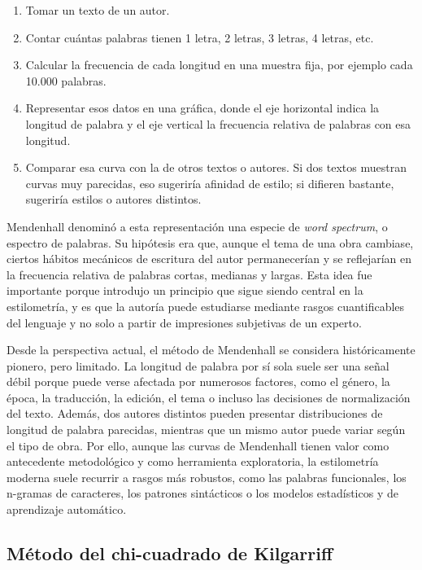 \documentclass[IB]{TFUOC}%
\begin{document}
\begin{enumerate}
    \item Tomar un texto de un autor.
    \item Contar cuántas palabras tienen 1 letra, 2 letras, 3 letras, 4 letras, etc.
    \item Calcular la frecuencia de cada longitud en una muestra fija, por ejemplo cada 10.000 palabras.
    \item Representar esos datos en una gráfica, donde el eje horizontal indica la longitud de palabra y el eje vertical la frecuencia relativa de palabras con esa longitud.
    \item Comparar esa curva con la de otros textos o autores. Si dos textos muestran curvas muy parecidas, eso sugeriría afinidad de estilo; si difieren bastante, sugeriría estilos o autores distintos.
\end{enumerate}

Mendenhall denominó a esta representación una especie de \textit{word spectrum}, o espectro de palabras. Su hipótesis era que, aunque el tema de una obra cambiase, ciertos hábitos mecánicos de escritura del autor permanecerían y se reflejarían en la frecuencia relativa de palabras cortas, medianas y largas. Esta idea fue importante porque introdujo un principio que sigue siendo central en la estilometría, y es que la autoría puede estudiarse mediante rasgos cuantificables del lenguaje y no solo a partir de impresiones subjetivas de un experto.

Desde la perspectiva actual, el método de Mendenhall se considera históricamente pionero, pero limitado. La longitud de palabra por sí sola suele ser una señal débil porque puede verse afectada por numerosos factores, como el género, la época, la traducción, la edición, el tema o incluso las decisiones de normalización del texto. Además, dos autores distintos pueden presentar distribuciones de longitud de palabra parecidas, mientras que un mismo autor puede variar según el tipo de obra. Por ello, aunque las curvas de Mendenhall tienen valor como antecedente metodológico y como herramienta exploratoria, la estilometría moderna suele recurrir a rasgos más robustos, como las palabras funcionales, los n-gramas de caracteres, los patrones sintácticos o los modelos estadísticos y de aprendizaje automático\cite{stamatatos2009survey}.

\subsection{Método del chi-cuadrado de Kilgarriff}
\end{document}
